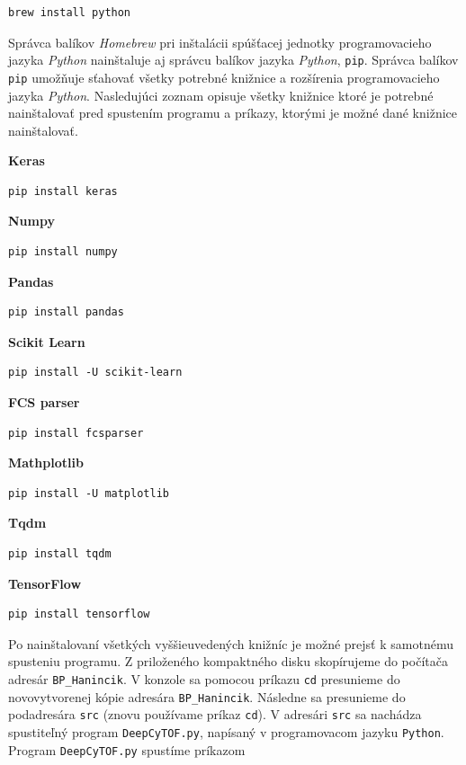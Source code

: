 \begin{Verbatim}[breaklines=true, breakanywhere=true]
brew install python
\end{Verbatim}

Správca balíkov \textit{Homebrew} pri inštalácii spúšťacej jednotky programovacieho jazyka \textit{Python} nainštaluje aj správcu balíkov jazyka \textit{Python}, \texttt{pip}. Správca balíkov \texttt{pip} umožňuje sťahovať všetky potrebné knižnice a rozšírenia programovacieho jazyka \textit{Python}. Nasledujúci zoznam opisuje všetky knižnice ktoré je potrebné nainštalovať pred spustením programu a príkazy, ktorými je možné dané knižnice nainštalovať.

\textbf{Keras}
\begin{Verbatim}[breaklines=true, breakanywhere=true]
pip install keras
\end{Verbatim}

\textbf{Numpy}
\begin{Verbatim}[breaklines=true, breakanywhere=true]
pip install numpy
\end{Verbatim}

\textbf{Pandas}
\begin{Verbatim}[breaklines=true, breakanywhere=true]
pip install pandas
\end{Verbatim}

\textbf{Scikit Learn}
\begin{Verbatim}[breaklines=true, breakanywhere=true]
pip install -U scikit-learn
\end{Verbatim}

\textbf{FCS parser}
\begin{Verbatim}[breaklines=true, breakanywhere=true]
pip install fcsparser
\end{Verbatim}

\textbf{Mathplotlib}
\begin{Verbatim}[breaklines=true, breakanywhere=true]
pip install -U matplotlib
\end{Verbatim}

\textbf{Tqdm}
\begin{Verbatim}[breaklines=true, breakanywhere=true]
pip install tqdm
\end{Verbatim}

\textbf{TensorFlow}
\begin{Verbatim}[breaklines=true, breakanywhere=true]
pip install tensorflow
\end{Verbatim}

\begin{sloppypar}
Po nainštalovaní všetkých vyššieuvedených knižníc je možné prejsť k samotnému spusteniu programu. Z priloženého kompaktného disku skopírujeme do počítača adresár \texttt{BP_Hanincik}. V konzole sa pomocou príkazu \texttt{cd} presunieme do novovytvorenej kópie adresára \texttt{BP_Hanincik}. Následne sa presunieme do podadresára \texttt{src} (znovu používame príkaz \texttt{cd}). V adresári \texttt{src} sa nachádza spustiteľný program \texttt{DeepCyTOF.py}, napísaný v programovacom jazyku \texttt{Python}. Program \texttt{DeepCyTOF.py} spustíme príkazom 
\end{sloppypar}

